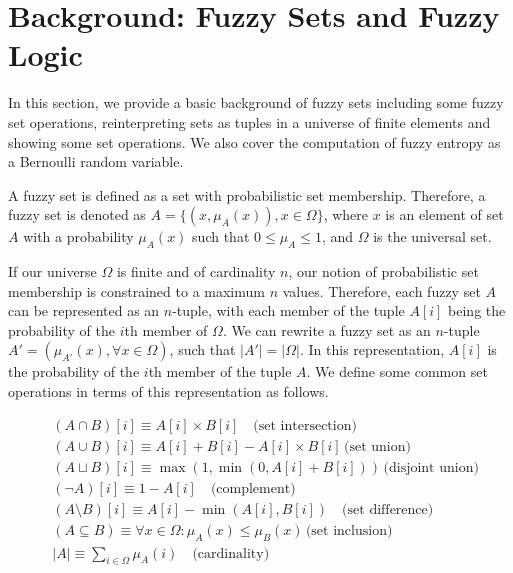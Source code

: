 \documentclass{book}
\newcommand{\card}[1]{\left| #1 \right|}
\begin{document}
\section{Background: Fuzzy Sets and Fuzzy Logic} \label{sec: math}

In this section, we provide a basic background of fuzzy sets including some
fuzzy set operations, reinterpreting sets as tuples in a universe of finite
elements and showing some set operations. We also cover the computation of
fuzzy entropy as a Bernoulli random variable. 

A fuzzy set is defined as a set with probabilistic set membership. Therefore, a
fuzzy set is denoted as $A = \{ (x, \mu_A(x)), x \in \Omega\}$,  where $x$ is
an element of set $A$ with a probability $\mu_A(x)$ such that $0 \leq \mu_A
\leq 1$, and $\Omega$ is the universal set. 

If our universe $\Omega$ is finite and of cardinality $n$, our notion of
probabilistic set membership is constrained to a maximum $n$ values. Therefore,
each fuzzy set $A$ can be represented as an $n$-tuple, with each member of the
tuple $A[i]$ being the probability of the $i$th member of $\Omega$. We can
rewrite a fuzzy set as an $n$-tuple $A' = ( \mu_{A'}(x), \forall x \in \Omega
)$, such that $\card{A'} = \card \Omega$. In this representation, $A[i]$ is the
probability of the $i$th member of the tuple $A$. We define some common set
operations in terms of this representation as follows.

{\footnotesize \begin{align*} &(A \cap B)[i] \equiv  A[i] \times B[i] \quad
\text{(set intersection)} \\ &(A \cup B)[i] \equiv  A[i] + B[i]  - A[i] \times
B[i] \, \text{(set union)}\\ &(A \sqcup B)[i] \equiv  \max(1, \min(0, A[i] +
B[i])) \, \text{(disjoint union)}\\ &(\lnot A)[i] \equiv 1 - A[i] \quad
\text{(complement)}\\ &(A \setminus B)[i] \equiv A[i]  - \min(A[i], B[i]) \quad
\text{(set difference)} \\ &(A \subseteq B) \equiv \forall x \in \Omega:
\mu_A(x) \leq \mu_B(x) \, \text{(set inclusion)}\\ &\card A \equiv \sum_{i \in
\Omega} \mu_A (i) \quad \text{(cardinality)} \\
\end{align*} }
\end{document}
